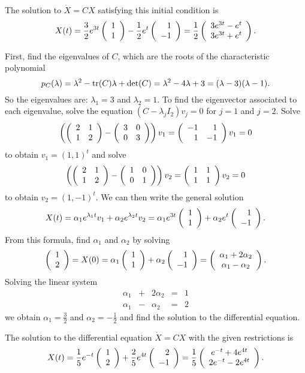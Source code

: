 \documentclass{ximera}
\begin{document}
\newpage
{} \ans The solution to $\dot{X} = CX$ satisfying this
initial condition is
\[
X(t) = \frac{3}{2}e^{3t}\left(\begin{array}{r} 1 \\ 1\end{array}\right) - \frac{1}{2}e^t\left(\begin{array}{r} 1 \\ -1\end{array}\right)
= \frac{1}{2}\left(\begin{array}{c} 3e^{3t} - e^t \\ 3e^{3t} + e^t\end{array}\right).
\]

\soln First, find the eigenvalues of $C$, which are the roots of the
characteristic polynomial
\[
p_C(\lambda) = \lambda^2 - {\rm tr}(C)\lambda + \det(C) =
\lambda^2 - 4\lambda + 3 = (\lambda - 3)(\lambda - 1).
\]
So the eigenvalues are: $\lambda_1 = 3$ and $\lambda_2 = 1$.
To find the eigenvector associated to each eigenvalue, solve
the equation $(C - \lambda_jI_2)v_j = 0$ for $j = 1$ and $j = 2$.  Solve
\[
\left(\left(\begin{array}{rr} 2 & 1\\ 1 &2\end{array}\right) - \left(\begin{array}{rr} 3 & 0\\ 0 &3\end{array}\right)\right)v_1 =
\left(\begin{array}{rr} -1 & 1\\ 1 &-1\end{array}\right)v_1 = 0
\]
to obtain $v_1 = (1,1)^t$ and solve
\[
\left(\left(\begin{array}{rr} 2 & 1\\ 1 &2\end{array}\right) - \left(\begin{array}{rr} 1 & 0\\ 0 &1\end{array}\right)\right)v_2 =
\left(\begin{array}{rr} 1 & 1\\ 1 &1\end{array}\right)v_2 = 0
\]
to obtain $v_2 = (1,-1)^t$.  We can then write the general solution
\[
X(t) = \alpha_1e^{\lambda_1 t}v_1 + \alpha_2e^{\lambda_2 t}v_2
= \alpha_1e^{3t}\left(\begin{array}{r} 1 \\ 1\end{array}\right) + \alpha_2e^t\left(\begin{array}{r} 1 \\ -1\end{array}\right).
\]
From this formula, find $\alpha_1$ and $\alpha_2$ by solving
\[
\left(\begin{array}{r} 1 \\ 2\end{array}\right) = X(0) = \alpha_1\left(\begin{array}{r} 1 \\ 1\end{array}\right) + \alpha_2\left(\begin{array}{r} 1 \\ -1\end{array}\right) =
\left(\begin{array}{c} \alpha_1 + 2\alpha_2 \\ \alpha_1 - \alpha_2\end{array}\right).
\]
Solving the linear system
\[
\begin{array}{rrrrr}
\alpha_1 & + & 2\alpha_2 & = & 1 \\
\alpha_1 & - & \alpha_2 & = & 2
\end{array}
\]
we obtain $\alpha_1 = \frac{3}{2}$ and $\alpha_2 = -\frac{1}{2}$
and find the solution to the differential equation.

 \ans The solution to the differential equation $\dot{X} =
CX$ with the given restrictions is
\[
X(t) = \frac{1}{5}e^{-t}\left(\begin{array}{r} 1 \\ 2\end{array}\right) + \frac{2}{5}e^{4t}\left(\begin{array}{r} 2 \\ -1\end{array}\right)
= \frac{1}{5}\left(\begin{array}{c} e^{-t} + 4e^{4t} \\ 2e^{-t} - 2e^{4t}\end{array}\right).
\]
\end{document}
